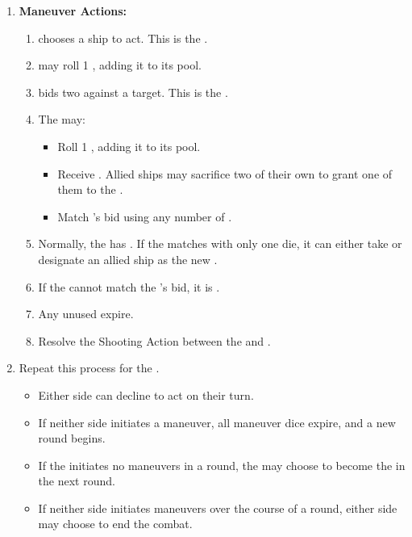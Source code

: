 \begin{enumerate}
    \item \textbf{Maneuver Actions:}
    \begin{enumerate}
        \item \attackingside{} chooses a ship to act. This is the \textbf{\attacker}.
        \item \attacker{} may roll 1 \dietype{\areadenial}, adding it to its \dicetype{\maneuver} pool.
        \item \attacker{} bids two \dicetype{\maneuver} against a target. This is the \textbf{}.
        \item The  may:
        \begin{itemize}
            \item Roll 1 \dietype{\areadenial}, adding it to its \dicetype{\maneuver} pool.
            \item Receive \dicetype{\escort}. Allied ships may sacrifice two of their own \dicetype{\maneuver} to grant one of them to the .
            \item Match \attacker{}’s bid using any number of \dicetype{\maneuver}.
        \end{itemize}
        \item Normally, the \attacker{} has \advantage. If the  matches with only one die, it can either take \advantage{} or designate an allied ship as the new .
        \item If the  cannot match the \attacker{}'s bid, it is \outflanked.
        \item Any unused  expire.
		\item Resolve the Shooting Action between the \attacker{} and .
    \end{enumerate}

    \item Repeat this process for the .
	\begin{itemize}
		\item Either side can decline to act on their turn.
		\item If neither side initiates a maneuver, all maneuver dice expire, and a new round begins.
		\item If the \attackingside{} initiates no maneuvers in a round, the  may choose to become the \attackingside{} in the next round.
		\item If neither side initiates maneuvers over the course of a round, either side may choose to end the combat.
	\end{itemize}
\end{enumerate}

